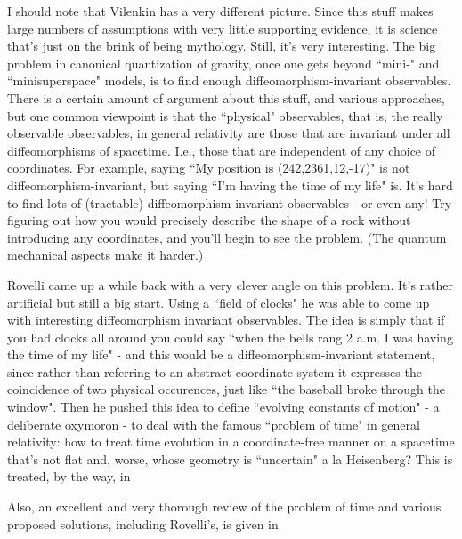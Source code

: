I should note that Vilenkin has a very different picture. Since this stuff makes large numbers of assumptions with very little supporting evidence, it is science that's just on the brink of being mythology. Still, it's very interesting.
The big problem in canonical quantization of gravity, once one gets beyond ``mini-" and ``minisuperspace" models, is to find enough diffeomorphism-invariant observables. There is a certain amount of argument about this stuff, and various approaches, but one common viewpoint is that the ``physical" observables, that is, the really observable observables, in general relativity are those that are invariant under all diffeomorphisms of spacetime. I.e., those that are independent of any choice of coordinates. For example, saying ``My position is (242,2361,12,-17)" is not diffeomorphism-invariant, but saying ``I'm having the time of my life" is. It's hard to find lots of (tractable) diffeomorphism invariant observables - or even any! Try figuring out how you would precisely describe the shape of a rock without introducing any coordinates, and you'll begin to see the problem. (The quantum mechanical aspects make it harder.)

Rovelli came up a while back with a very clever angle on this problem. It's rather artificial but still a big start. Using a ``field of clocks" he was able to come up with interesting diffeomorphism invariant observables. The idea is simply that if you had clocks all around you could say ``when the bells rang 2 a.m. I was having the time of my life" - and this would be a diffeomorphism-invariant statement, since rather than referring to an abstract coordinate system it expresses the coincidence of two physical occurences, just like ``the baseball broke through the window". Then he pushed this idea to define ``evolving constants of motion" - a deliberate oxymoron - to deal with the famous ``problem of time" in general relativity: how to treat time evolution in a coordinate-free manner on a spacetime that's not flat and, worse, whose geometry is ``uncertain" a la Heisenberg? This is treated, by the way, in

Also, an excellent and very thorough review of the problem of time and various proposed solutions, including Rovelli's, is given in

